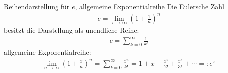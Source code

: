 \begin{karte}{Reihendarstellung für \(e\), allgemeine Exponentialreihe}
	Die Eulersche Zahl
	\begin{align}
		e=\lim_{n\to\infty}{\left(1+\frac{1}{n}\right)}^n 
	\end{align}
	besitzt die Darstellung als unendliche Reihe:
	\begin{align}
		e=\sum_{k=0}^{\infty}\frac{1}{k!} 
	\end{align}
	allgemeine Exponentialreihe:
	\begin{align}
		\lim_{n\to\infty}{\left(1+\frac{x}{n}\right)}^n=\sum_{k=0}^{\infty}\frac{x^n}{k!}=1+x+\frac{x^2}{2!}+\frac{x^3}{3!}+\cdots=:e^x 
	\end{align}
\end{karte}
